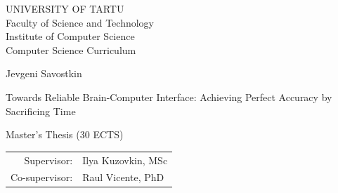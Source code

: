 \documentclass[12pt]{article}
\theoremstyle{definition}
\begin{document}
\thispagestyle{empty}
\begin{center}

\large
UNIVERSITY OF TARTU\\[2mm]
Faculty of Science and Technology\\
Institute of Computer Science\\
Computer Science Curriculum\\[2mm]

\vspace{25mm}

\Large Jevgeni Savostkin

\vspace{4mm}

\huge Towards Reliable Brain-Computer Interface: Achieving Perfect Accuracy by Sacrificing Time

\vspace{20mm}

\Large Master's Thesis (30 ECTS)

\end{center}

\vspace{2mm}

\begin{flushright}
 {
 \setlength{\extrarowheight}{5pt}
 \begin{tabular}{r l} 
  \sffamily Supervisor: & \sffamily Ilya Kuzovkin, MSc \\ 
  \sffamily Co-supervisor: & \sffamily Raul Vicente, PhD 
 \end{tabular}
 }
\end{flushright}

\vspace{10mm}

\vspace{2mm}



\vspace{2mm}

\end{document}
